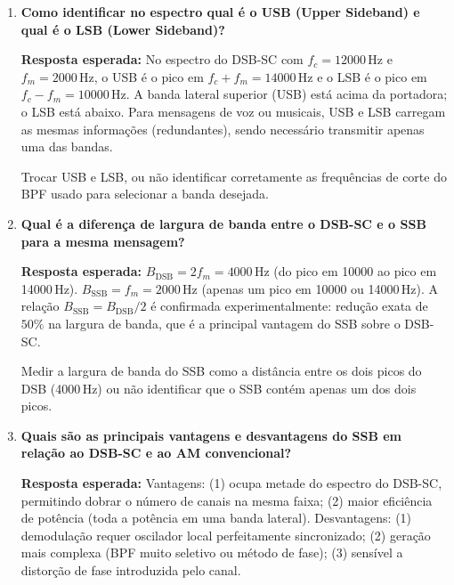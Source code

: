 \documentclass[11pt,a4paper]{article}
\begin{document}
\begin{enumerate}[label=\textbf{Q\arabic*.}, leftmargin=*, itemsep=1em]

  \item \textbf{Como identificar no espectro qual é o USB (Upper Sideband) e qual é o LSB (Lower Sideband)?}

    \textbf{Resposta esperada:} No espectro do DSB-SC com $f_c=12000$\,Hz e
    $f_m=2000$\,Hz, o USB é o pico em $f_c + f_m = 14000$\,Hz e o LSB é o pico em
    $f_c - f_m = 10000$\,Hz. A banda lateral superior (USB) está acima da portadora;
    o LSB está abaixo. Para mensagens de voz ou musicais, USB e LSB carregam as mesmas
    informações (redundantes), sendo necessário transmitir apenas uma das bandas.

    \begin{nota}
      Trocar USB e LSB, ou não identificar corretamente as frequências de corte do
      BPF usado para selecionar a banda desejada.
    \end{nota}

  \item \textbf{Qual é a diferença de largura de banda entre o DSB-SC e o SSB para a mesma mensagem?}

    \textbf{Resposta esperada:} $B_\text{DSB} = 2f_m = 4000$\,Hz (do pico em 10000 ao
    pico em 14000\,Hz). $B_\text{SSB} = f_m = 2000$\,Hz (apenas um pico em 10000 ou
    14000\,Hz). A relação $B_\text{SSB} = B_\text{DSB}/2$ é confirmada experimentalmente:
    redução exata de $50\%$ na largura de banda, que é a principal vantagem do SSB sobre
    o DSB-SC.

    \begin{nota}
      Medir a largura de banda do SSB como a distância entre os dois picos do DSB
      (4000\,Hz) ou não identificar que o SSB contém apenas um dos dois picos.
    \end{nota}

  \item \textbf{Quais são as principais vantagens e desvantagens do SSB em relação ao DSB-SC e ao AM convencional?}

    \textbf{Resposta esperada:} Vantagens: (1) ocupa metade do espectro do DSB-SC,
    permitindo dobrar o número de canais na mesma faixa; (2) maior eficiência de potência
    (toda a potência em uma banda lateral). Desvantagens: (1) demodulação requer
    oscilador local perfeitamente sincronizado; (2) geração mais complexa (BPF muito
    seletivo ou método de fase); (3) sensível a distorção de fase introduzida pelo canal.


\end{enumerate}
\end{document}
